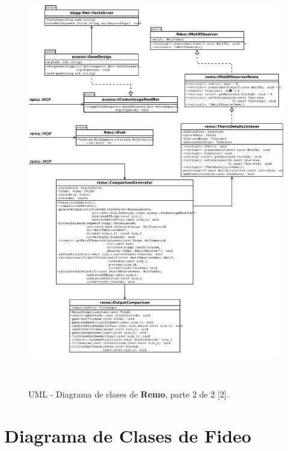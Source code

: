 \begin{figure}[!hbtp]
	\begin{center}
		\includegraphics[width=16.5cm, height=18cm]{image/remo2.png}
		\caption{UML - Diagrama de clases de \textbf{Remo}, parte 2 de 2 [2].}
		\label{remoDClase2}
	\end{center}
\end{figure}

\section{Diagrama de Clases de Fideo}

